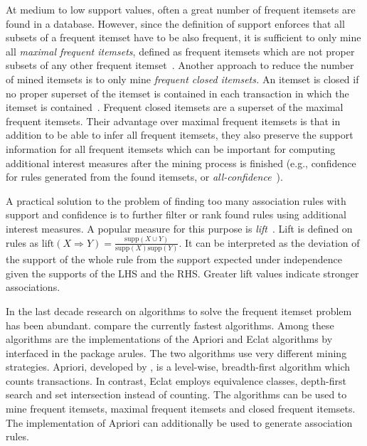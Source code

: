 \documentclass[10pt,a4paper]{article}
\newcommand{\strong}[1]{{\normalfont\fontseries{b}\selectfont #1}}
\newcommand{\pkg}[1]{\strong{#1}}
\begin{document}
At medium to low support values, often a great number of frequent
itemsets are found in a database.  However, since the definition of
support enforces that all subsets of a frequent itemset have to be also
frequent, it is sufficient to only mine all \emph{maximal frequent
  itemsets}, defined as frequent itemsets which are not proper subsets
of any other frequent
itemset~\citep{arules:Zaki+Parthasarathy+Ogihara+Li:1997}.  Another
approach to reduce the number of mined itemsets is to only mine
\emph{frequent closed itemsets.}  An itemset is closed if no proper
superset of the itemset is contained in each transaction in which the
itemset is contained~\citep{arules:Pasquier+Bastide+Taouil+Lakhal:1999,
  arules:Zaki:2004}.  Frequent closed itemsets are a superset of the
maximal frequent itemsets.  Their advantage over maximal frequent
itemsets is that in addition to be able to infer all frequent itemsets,
they also preserve the support information for all frequent itemsets
which can be important for computing additional interest measures after
the mining process is finished (e.g., confidence for rules
generated from the found itemsets, or 
\emph{all-confidence}~\citep{arules:Omiecinski:2003}).


A practical solution to the problem of finding too many 
association rules with support and confidence is
to further filter or rank found rules using additional interest measures.
A popular measure for this purpose is 
\emph{lift}~\citep{arules:Brin+Motwani+Ullman+Tsur:1997}.
Lift is defined on rules as $\mathrm{lift}(X \Rightarrow Y) = 
\frac{\mathrm{supp}(X \cup Y)}{ \mathrm{supp}(X) \mathrm{supp}(Y)}$.
It can be interpreted as the deviation of the support of the whole 
rule from the support expected under independence given the 
supports of the LHS and the RHS.
Greater lift values indicate stronger associations.


In the last decade research on algorithms to solve the frequent itemset
problem has been abundant.  \cite{arules:Goethals+Zaki:2004} compare the
currently fastest algorithms.  Among these algorithms are the
implementations of the Apriori and Eclat algorithms by
\cite{arules:Borgelt:2003} interfaced in the package \pkg{arules}.
The two algorithms use very different mining strategies.  Apriori,
developed by \cite{arules:Agrawal+Srikant:1994}, is a level-wise,
breadth-first algorithm which counts transactions.  In contrast, Eclat
\citep{arules:Zaki+Parthasarathy+Ogihara+Li:1997} employs equivalence
classes, depth-first search and set intersection instead of counting.
The algorithms can be used to mine frequent itemsets, maximal frequent
itemsets and closed frequent itemsets.  The implementation of Apriori
can additionally be used to generate association rules.
\end{document}
